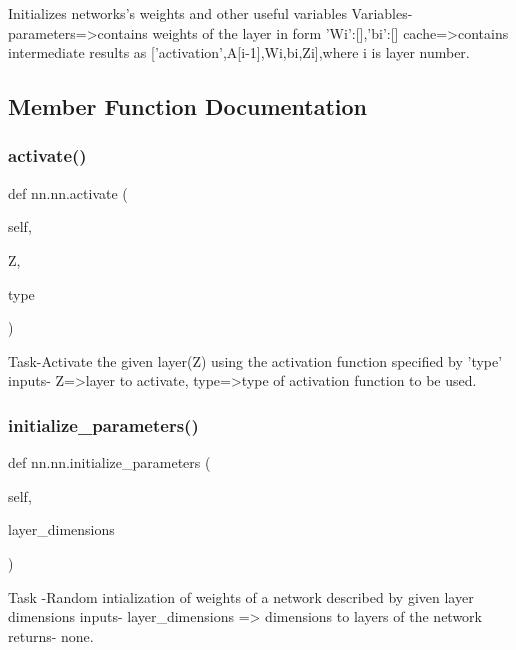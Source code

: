 \begin{DoxyVerb}Initializes networks's weights and other useful variables
Variables-parameters=>contains weights of the layer in form {'Wi':[],'bi':[]}
  cache=>contains intermediate results as ['activation',A[i-1],Wi,bi,Zi],where i
  is layer number.
\end{DoxyVerb}
 

\subsection{Member Function Documentation}
\mbox{\label{classnn_1_1nn_a60e827e96d3ce9b65a7563093cbd26fe}} 
\subsubsection{\texorpdfstring{activate()}{activate()}}
{\footnotesize\ttfamily def nn.\+nn.\+activate (\begin{DoxyParamCaption}\item[{}]{self,  }\item[{}]{Z,  }\item[{}]{type }\end{DoxyParamCaption})}

\begin{DoxyVerb}Task-Activate the given layer(Z) using the activation function specified by 'type'
inputs- Z=>layer to activate, type=>type of activation function to be used.
\end{DoxyVerb}
 \mbox{\label{classnn_1_1nn_a9821fed1369b4d709fe297fe9e07d97b}} 
\subsubsection{\texorpdfstring{initialize\+\_\+parameters()}{initialize\_parameters()}}
{\footnotesize\ttfamily def nn.\+nn.\+initialize\+\_\+parameters (\begin{DoxyParamCaption}\item[{}]{self,  }\item[{}]{layer\+\_\+dimensions }\end{DoxyParamCaption})}

\begin{DoxyVerb}Task -Random intialization of weights of a network described by given layer dimensions
inputs- layer_dimensions => dimensions to layers of the network
returns- none.
\end{DoxyVerb}
 


